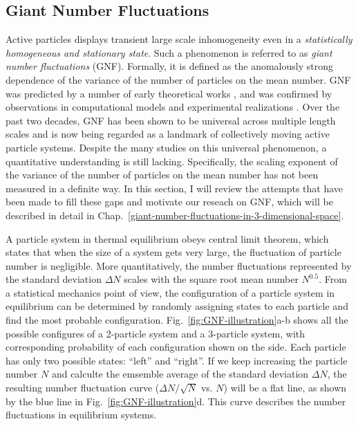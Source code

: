 \subsection{Giant Number Fluctuations}
\label{sec:intro-GNF}
Active particles displays transient large scale inhomogeneity even in a \textit{statistically homogeneous and stationary state}.
Such a phenomenon is referred to as \textit{giant number fluctuations} (GNF). Formally, it is defined as the anomalously strong dependence of the variance of the number of particles on the mean number.
GNF was predicted by a number of early theoretical works \cite{Toner1995, Toner1998,
Tu1998, Simha2002, Ramaswamy2003, Saintillan2008a, Saintillan2008b, Ramaswamy2010}, and was confirmed by observations in computational models
\cite{Mishra2006, Chate2008, Dey2012, Saintillan2012, Ngo2014, Mahault2019} and experimental realizations
\cite{Narayan2007, Aranson2008, Zhang2010, Deseigne2010, Schaller2013, Palacci2013,
Kawaguchi2017, Nishiguchi2017, Karani2019}. Over the past two decades, GNF has been shown to be universal across multiple length scales and is now being regarded as a landmark of collectively moving active particle systems. Despite the many studies on this universal phenomenon, a quantitative understanding is still lacking. Specifically, the scaling exponent of the variance of the number of particles on the mean number has not been measured in a definite way. In this section, I will review the attempts that have been made to fill these gaps and motivate our reseach on GNF, which will be described in detail in Chap.~\ref{giant-number-fluctuations-in-3-dimensional-space}.

A particle system in thermal equilibrium obeys central limit theorem, which states that when the size of a system gets very large, the fluctuation of particle number is negligible. More quantitatively, the number fluctuations represented by the standard deviation $\Delta N$ scales with the square root mean number $N^{0.5}$. From a statistical mechanics point of view, the configuration of a particle system in equilibrium can be determined by randomly assigning states to each particle and find the most probable configuration. Fig.~\ref{fig:GNF-illustration}a-b shows all the possible configures of a 2-particle system and a 3-particle system, with corresponding probability of each configuration shown on the side. Each particle has only two possible states: ``left'' and ``right''. If we keep increasing the particle number $N$ and calculte the emsemble average of the standard deviation $\Delta N$, the resulting number fluctuation curve ($\Delta N/\sqrt N$ vs. $N$) will be a flat line, as shown by the blue line in Fig.~\ref{fig:GNF-illustration}d. This curve describes the number fluctuations in equilibrium systems.

